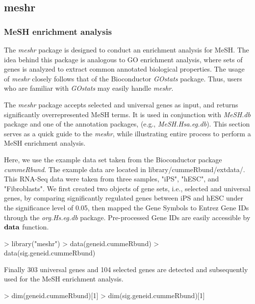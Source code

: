 \documentclass[11pt]{article}
\newcommand{\Rpackage}[1]{{\textit{#1}}}
\begin{document}
\clearpage
\subsection{meshr}
\subsubsection{MeSH enrichment analysis}
The \Rpackage{meshr} package is designed to conduct an enrichment analysis for MeSH.  The idea behind this package is analogous to GO enrichment analysis, where sets of genes is analyzed to extract common annotated biological properties. The usage of \Rpackage{meshr} closely follows that of the Bioconductor \Rpackage{GOstats} package. Thus, users who are familiar with \Rpackage{GOstats} may easily handle \Rpackage{meshr}.

The \Rpackage{meshr} package accepts selected and universal genes as input, and returns significantly overrepresented MeSH terms. It is used in conjunction with \Rpackage{MeSH.db} package and one of the annotation packages, (e.g., \Rpackage{MeSH.Hsa.eg.db}). This section serves as a quick guide to the \Rpackage{meshr}, while illustrating entire process to perform a MeSH enrichment analysis.

Here, we use the example data set taken from the Bioconductor package \Rpackage{cummeRbund}. The example data are located in library/cummeRbund/extdata/. This RNA-Seq data were taken from three samples, "iPS", "hESC", and  "Fibroblasts".
We first created two objects of gene sets, i.e., selected and universal genes,
by comparing significantly regulated genes between iPS and hESC under the significance level of 0.05, then mapped the Gene Symbols to Entrez Gene IDs through the \Rpackage{org.Hs.eg.db} package. Pre-processed Gene IDs are easily accessible by $\bf{data}$ function.

\begin{center}
\begin{Schunk}
\begin{Sinput}
> library("meshr")
> data(geneid.cummeRbund)
> data(sig.geneid.cummeRbund)
\end{Sinput}
\end{Schunk}
\end{center}

Finally 303 universal genes and 104 selected genes are detected and subsequently
used for the MeSH enrichment analysis.

\begin{center}
\begin{Schunk}
\begin{Sinput}
> dim(geneid.cummeRbund)[1]
> dim(sig.geneid.cummeRbund)[1]
\end{Sinput}
\end{Schunk}
\end{center}
\end{document}
